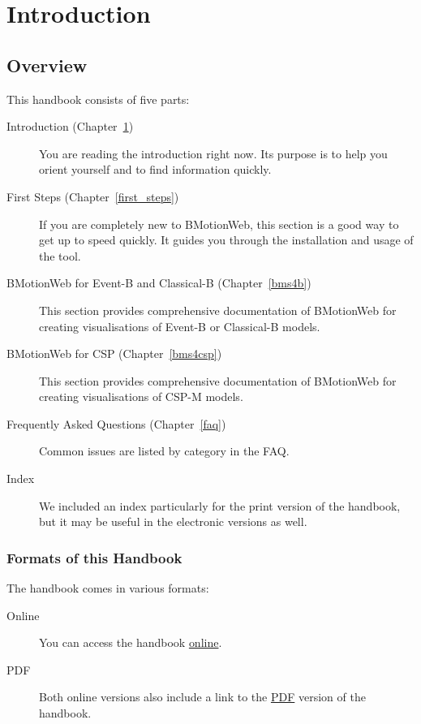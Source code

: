 \documentclass[twoside,10pt]{book}
\begin{document}
\chapter{Introduction}
\label{introduction}

\section{Overview}

This handbook consists of five parts:

\begin{description}
	\item[Introduction (Chapter~\ref{introduction})] You are reading the introduction right now.  Its purpose is to help you orient yourself and to find information quickly.
	\item[First Steps (Chapter~\ref{first_steps})] If you are completely new to BMotionWeb, this section is a good way to get up to speed quickly.
	It guides you through the installation and usage of the tool.
	\item[BMotionWeb for Event-B and Classical-B (Chapter~\ref{bms4b})] This section provides comprehensive documentation of BMotionWeb for creating visualisations of Event-B or Classical-B models.
	\item[BMotionWeb for CSP (Chapter~\ref{bms4csp})] This section provides comprehensive documentation of BMotionWeb for creating visualisations of CSP-M models.
	\item[Frequently Asked Questions  (Chapter~\ref{faq})] Common issues are listed by category in the FAQ.
	\item[Index] We included an index particularly for the print version of the handbook, but it may be useful in the electronic versions as well.
\end{description}

\subsection{Formats of this Handbook}
\label{handbook_formats}

The handbook comes in various formats:

\begin{description}
	\item[Online] You can access the handbook \href{https://www3.hhu.de/stups/handbook/bmotion/current/html}{online}.
	\item[PDF] Both online versions also include a link to the \href{https://www3.hhu.de/stups/handbook/bmotion/current/pdf/bms-doc.pdf}{PDF} version of the handbook.
\end{description}
\end{document}
